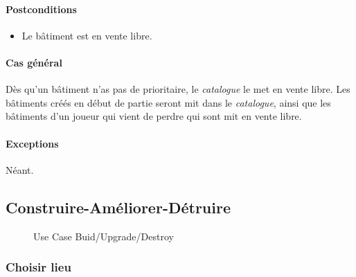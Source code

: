 \documentclass[a4paper,11pt]{report}
\begin{document}
\paragraph{Postconditions}
\begin{itemize}
 \item Le bâtiment est en vente libre.
\end{itemize}
\paragraph{Cas général}
Dès qu'un bâtiment n'as pas de prioritaire, le \textit{catalogue} le met en vente libre. Les bâtiments créés en début de partie seront mit dans le \textit{catalogue}, ainsi que les bâtiments d'un joueur qui vient de perdre qui sont mit en vente libre.
\paragraph{Exceptions} Néant.

\newpage
\subsection{Construire-Améliorer-Détruire}
\begin{figure}[ht]
    \caption{Use Case Buid/Upgrade/Destroy}
\end{figure}

\subsubsection{Choisir lieu}
\end{document}
